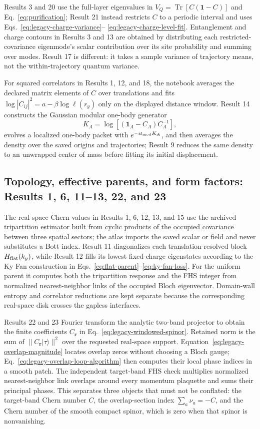 \documentclass[aps,prb,twocolumn,floatfix,nofootinbib,superscriptaddress]{revtex4-2}
\newcommand{\Tr}{\operatorname{Tr}}
\begin{document}
Results 3 and 20 use the full-layer eigenvalues in
$V_Q=\Tr[C(\mathbf{1}-C)]$ and Eq.~\eqref{eq:purification}; Result 21 instead restricts
$C$ to a periodic interval and uses Eqs.~\eqref{eq:legacy-charge-variance}--
\eqref{eq:legacy-charge-level-fit}.  Entanglement and charge contours in Results 3 and 13
are obtained by distributing each restricted-covariance eigenmode's scalar contribution
over its site probability and summing over modes.  Result 17 is different: it takes a
sample variance of trajectory means, not the within-trajectory quantum variance.

For squared correlators in Results 1, 12, and 18, the notebook averages the declared
matrix elements of $C$ over translations and fits
$\log |C_{ij}|^2=a-\beta\log\ell(r_y)$ only on the displayed distance window.  Result 14
constructs the Gaussian modular one-body generator
\begin{equation}
 K_A=\log[(\mathbf{1}_A-C_A)C_A^{-1}],
 \label{eq:atlas-recipe-modular-generator}
\end{equation}
evolves a localized one-body packet with $e^{-it_{\rm mod}K_A}$, and then averages the
density over the saved origins and trajectories; Result 9 reduces the same density to an
unwrapped center of mass before fitting its initial displacement.

\subsection{Topology, effective parents, and form factors: Results 1, 6, 11--13, 22, and 23}

The real-space Chern values in Results 1, 6, 12, 13, and 15 use the archived tripartition
estimator built from cyclic products of the occupied covariance between three spatial
sectors; the atlas imports the saved scalar or field and never substitutes a Bott index.
Result 11 diagonalizes each translation-resolved block $H_{\rm flat}(k_y)$, while
Result 12 fills its lowest fixed-charge eigenstates according to the Ky Fan construction
in Eqs.~\eqref{eq:flat-parent}--\eqref{eq:ky-fan-loss}.  For the uniform parent it computes
both the tripartition response and the FHS integer from normalized nearest-neighbor links
of the occupied Bloch eigenvector.  Domain-wall entropy and correlator reductions are kept
separate because the corresponding real-space disk crosses the gapless interfaces.

Results 22 and 23 Fourier transform the analytic two-band projector to obtain the finite
coefficients $C_{\mathbf r}$ in Eq.~\eqref{eq:legacy-windowed-spinor}.  Retained norm is
the sum of $\|C_{\mathbf r}|\tau\rangle\|^2$ over the requested real-space support.
Equation~\eqref{eq:legacy-overlap-magnitude} locates overlap zeros without choosing a
Bloch gauge; Eq.~\eqref{eq:legacy-overlap-loop-algorithm} then computes their local phase
indices in a smooth patch.  The independent target-band FHS check multiplies normalized
nearest-neighbor link overlaps around every momentum plaquette and sums their principal
phases.  This separates three objects that must not be conflated: the target-band Chern
number $C$, the overlap-section index $\sum_a\nu_a=-C$, and the Chern number of the smooth
compact spinor, which is zero when that spinor is nonvanishing.
\end{document}

